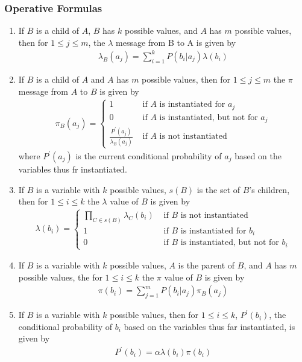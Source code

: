 \documentclass[12pt,twoside]{article}
\begin{document}
	\subsubsection{Operative Formulas}
		\begin{enumerate}
			\item If $B$ is a child of $A$, $B$ has $k$ possible values, and $A$ has $m$ possible values, then for $1\leq j \leq m$, the $\lambda$ message from B to A is given by
				\begin{align*}
					\lambda_B(a_j) = \sum_{i=1}^k P(b_i\vert a_j) \lambda(b_i)
				\end{align*}
	
			\item If $B$ is a child of $A$ and $A$ has $m$ possible values, then for $1 \leq j \leq m$ the  $\pi$ message from $A$ to $B$ is given by
				\begin{align*}
					\pi_B(a_j) = \begin{cases}
					1															& \text{ if $A$ is instantiated for $a_j$}\\
					0															& \text{ if $A$ is instantiated, but not for $a_j$}\\
					\frac{P^\prime(a_j)}{\lambda_B(a_j)}	& \text{ if $A$ is not instantiated}
					\end{cases}
				\end{align*}
					where $P^\prime (a_j)$ is the current conditional probability of $a_j$ based on the variables thus fr instantiated.
					
			\item If $B$ is a variable with $k$ possible values, $s(B)$ is the set of $B$'s children, then for $1 \leq i \leq k$ the $\lambda$ value of $B$ is given by
				\begin{align*}
					\lambda(b_i) = \begin{cases}
					\prod_{C\in s(B)} \lambda_C(b_i)			&  \text{ if $B$ is not instantiated}\\
					1															&	\text{ if $B$ is instantiated for $b_i$}\\
					0															&	\text{ if $B$ is instantiated, but not for $b_i$}
					\end{cases}
				\end{align*}
				
			\item If $B$ is a variable with $k$ possible values, $A$ is the parent of $B$, and $A$ has $m$ possible values, the for $1\leq i \leq k$ the $\pi$ value of $B$ is given by
				\begin{align*}
					\pi(b_i)	= \sum_{j=1}^m P(b_i\vert a_j) \pi_B(a_j)
				\end{align*}
				
			\item If $B$ is a variable with $k$  possible values, then for $1 \leq i \leq k$, $P^\prime (b_i)$, the conditional probability of $b_i$ based on the variables thus far instantiated, is given by
				\begin{align*}
					P^\prime(b_i) = \alpha \lambda(b_i)\pi(b_i)
				\end{align*}

			\end{enumerate}
\end{document}
